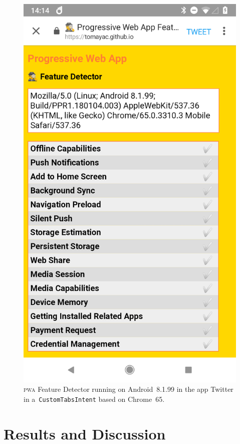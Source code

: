 \documentclass[sigconf]{acmart}
\begin{document}
\begin{figure}[t]
  \centering
  \includegraphics[width=.75\columnwidth,frame]{pwa-feature-detector-twitter-android-chrome65}
  \caption[\textsc{pwa} Feature Detector running in Twitter.]{
    \textsc{pwa} Feature Detector running on Android~8.1.99 in the app Twitter
    in a~\texttt{CustomTabsIntent} based on Chrome~65.}
  \label{fig:twitter-android-chrome65}
\end{figure}

\section{Results and Discussion}
\label{sec:results-and-discussion}
\end{document}
